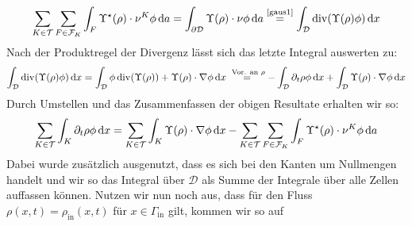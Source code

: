 \begin{align*}
	\sum_{K\in \mathcal{T}} \sum_{F \in \mathcal{F}_K} \int_F \Upsilon^{\star}(\rho) \cdot \nu^K \phi \, \mathrm{d} a = \int_{\partial \mathcal{D}} \Upsilon(\rho) \cdot \nu \phi \, \mathrm{d} a \stackrel{\text{\eqref{gaus1}}}{=} \int_{\mathcal{D}} \operatorname{div} (\Upsilon(\rho)\phi) \, \mathrm{d} x
\end{align*}
Nach der Produktregel der Divergenz lässt sich das letzte Integral auswerten zu:
\begin{align*}
	 \int_{\mathcal{D}} \operatorname{div} (\Upsilon(\rho)\phi) \, \mathrm{d} x = \int_{\mathcal{D}} \phi \operatorname{div}(\Upsilon(\rho)) + \Upsilon(\rho) \cdot \nabla \phi \, \mathrm{d} x \stackrel{\text{ Vor. an }\rho }{=} - \int_{\mathcal{D}} \partial_t \rho \phi \, \mathrm{d} x + \int_{\mathcal{D}} \Upsilon(\rho) \cdot \nabla \phi \, \mathrm{d} x
\end{align*}
Durch Umstellen und das Zusammenfassen der obigen Resultate erhalten wir so: 
\begin{align*}
	\sum_{K \in \mathcal{T}} \int_K \partial_t \rho  \phi \, \mathrm{d} x = \sum_{K \in \mathcal{T}} \int_K \Upsilon(\rho ) \cdot \nabla \phi \, \mathrm{d} x - 	\sum_{K\in \mathcal{T}} \sum_{F \in \mathcal{F}_K} \int_F \Upsilon^{\star}(\rho) \cdot \nu^K \phi \, \mathrm{d} a
\end{align*}
Dabei wurde zusätzlich ausgenutzt, dass es sich bei den Kanten um Nullmengen handelt und wir so das Integral über $ \mathcal{D} $ als Summe der Integrale über alle Zellen auffassen können. Nutzen wir nun noch aus, dass für den Fluss  $\rho(x,t) = \rho_{\text{in}}(x,t)$ für $ x \in \Gamma_{\text{in}} $ gilt, kommen wir so auf 

